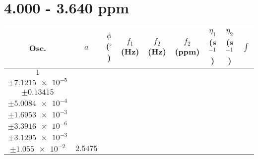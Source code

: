\documentclass[8pt]{article}
\begin{document}
\section*{4.000 - 3.640 ppm}
\begin{longtable}[l]{c c c c c c c c c}
\toprule
Osc. & $a$ & $\phi$ ($^{\circ}$) & $f_1$ (Hz) & $f_2$ (Hz) & $f_2$ (ppm) & $\eta_1$ (s$^{-1}$) & $\eta_2$ (s$^{-1}$) & $\int$\\
\midrule
$\num{1}$ & \begin{tabular}[c]{@{}c@{}}$\num{3.0515e-2}$ \\ $\pm\num{7.1215e-5}$\end{tabular} & \begin{tabular}[c]{@{}c@{}}$\num{-0.26227}$ \\ $\pm\num{0.13415}$\end{tabular} & \begin{tabular}[c]{@{}c@{}}$\num{-9.0998}$ \\ $\pm\num{5.0084e-4}$\end{tabular} & \begin{tabular}[c]{@{}c@{}}$\num{1.8487e+3}$ \\ $\pm\num{1.6953e-3}$\end{tabular} & \begin{tabular}[c]{@{}c@{}}$\num{3.6984}$ \\ $\pm\num{3.3916e-6}$\end{tabular} & \begin{tabular}[c]{@{}c@{}}$\num{1.1686}$ \\ $\pm\num{3.1295e-3}$\end{tabular} & \begin{tabular}[c]{@{}c@{}}$\num{4.2349}$ \\ $\pm\num{1.055e-2}$\end{tabular} & $\num{2.5475}$\\

\end{longtable}
\end{document}

